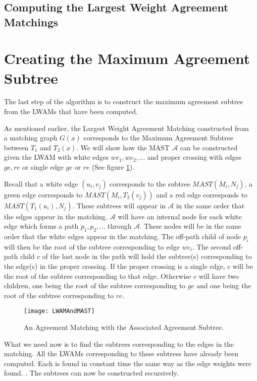 \subsection{Computing the Largest Weight Agreement Matchings}


\section{Creating the Maximum Agreement Subtree}
The last step of the algorithm is to construct the maximum agreement subtree from the LWAMs that have been computed.

As mentioned earlier, the Largest Weight Agreement Matching constructed from a matching graph $G(x)$ corresponds to the Maximum Agreement Subtree between $T_1$ and $T_2(x)$. We will show how the MAST $\mathcal{A}$ can be constructed given the LWAM with white edges ${we_1, we_2, ...}$ and proper crossing with edges ${ge, re}$ or single edge $ge$ or $re$ (See figure \ref{lwam_mast_figure}).

Recall that a white edge $(u_i, v_j)$ corresponds to the subtree $MAST(M_i,N_j)$, a green edge corresponds to $MAST(M_i,T_2(v_j))$ and a red edge corresponds to $MAST(T_1(u_i),N_j)$. These subtrees will appear in $\mathcal{A}$ in the same order that the edges appear in the matching. $\mathcal{A}$ will have an internal node for each white edge which forms a path ${p_1, p_2, ...}$ through $\mathcal{A}$. These nodes will be in the same order that the white edges appear in the matching. The off-path child of node $p_i$ will then be the root of the subtree corresponding to edge $we_i$. The second off-path child $c$ of the last node in the path will hold the subtree(s) corresponding to the edge(s) in the proper crossing. If the proper crossing is a single edge, $c$ will be the root of the subtree corresponding to that edge. Otherwise $c$ will have two children, one being the root of the subtree corresponding to $ge$ and one being the root of the subtree corresponding to $re$.

\begin{figure}
	\label{lwam_mast_figure}
	\texttt{[image: LWAMAndMAST]}
	\caption{An Agreement Matching with the Associated Agreement Subtree. \cite{nlogn}}
\end{figure}

What we need now is to find the subtrees corresponding to the edges in the matching. All the LWAMs corresponding to these subtrees have already been computed. Each is found in constant time the same way as the edge weights were found.  . The subtrees can now be constructed recursively.


